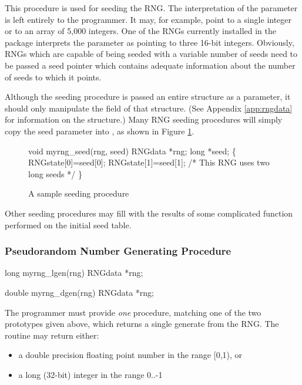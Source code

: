 This procedure is used for seeding the RNG.  The interpretation of the
 parameter is left entirely to the programmer.  It may, for
example, point to a single integer or to an array of 5,000 integers.
One of the RNGs currently installed in the package interprets the
 parameter as pointing to three 16-bit integers.  Obviously,
RNGs which are capable of being seeded with a variable number of seeds
need to be passed a seed pointer which contains adequate information
about the number of seeds to which it points.

Although the seeding procedure is passed an entire 
structure as a parameter, it should only manipulate the 
field of that structure.  (See Appendix \ref{app:rngdata} for information
on the  structure.)  Many RNG seeding procedures will simply
copy the seed parameter into , as shown in Figure
\ref{fig:sampleseed}.

\begin{figure}
\begin{example}
	void myrng_seed(rng, seed)
	RNGdata *rng;
	long *seed;
	\{
	RNGstate[0]=seed[0];
	RNGstate[1]=seed[1]; /* This RNG uses two long seeds */
	\}
\end{example}
\caption{A sample seeding procedure}
\label{fig:sampleseed}
\end{figure}

Other seeding procedures may fill  with the results
of some complicated function performed on the initial seed table.

\subsubsection{Pseudorandom Number Generating Procedure}

\begin{example}
long myrng_lgen(rng)
RNGdata *rng;

double myrng_dgen(rng)
RNGdata *rng;\\
\end{example}

The programmer must provide {\em one} procedure, matching one of the two
prototypes given above, which returns a
single generate from the RNG.  The routine may return either:
\begin{itemize}
\item a double precision floating point number in the range [0,1), or
\item a long (32-bit) integer in the range 0..-1
\end{itemize}

